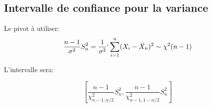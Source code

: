 \subsection*{Intervalle de confiance pour la variance}\label{stats:intconfvar}

 
Le pivot à utiliser:
\[\dfrac{n-1}{\sigma^2}S^2_n=\dfrac{1}{\sigma^2}`\sum^n_{i=1} (X_i-\bar{X}_n)^2 \sim \chi^2(n-1)\]

L'intervalle sera:

\[\left [ \dfrac{n-1}{\chi^2_{n-1,\alpha/2}}S_n^2,\dfrac{n-1}{\chi^2_{n-1,1-\alpha/2}}S_n^2 \right ] \]


 